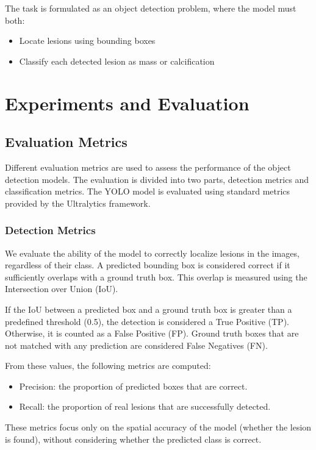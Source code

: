 \documentclass[12pt,a4paper]{article} %
\begin{document}
The task is formulated as an object detection problem, where the model must both:
\begin{itemize}
  \item Locate lesions using bounding boxes
  \item Classify each detected lesion as mass or calcification
\end{itemize}

\section{Experiments and Evaluation}
\subsection{Evaluation Metrics}

Different evaluation metrics are used to assess the performance of the object detection models. The evaluation is divided into two parts, detection metrics and classification metrics. The YOLO model is evaluated using standard metrics provided by the Ultralytics framework.

\subsubsection{Detection Metrics}

We evaluate the ability of the model to correctly localize lesions in the images, regardless of their class. A predicted bounding box is considered correct if it sufficiently overlaps with a ground truth box. This overlap is measured using the Intersection over Union (IoU).

If the IoU between a predicted box and a ground truth box is greater than a predefined threshold (0.5), the detection is considered a True Positive (TP). Otherwise, it is counted as a False Positive (FP). Ground truth boxes that are not matched with any prediction are considered False Negatives (FN).

From these values, the following metrics are computed:

\begin{itemize}
    \item Precision: the proportion of predicted boxes that are correct.
    \item Recall: the proportion of real lesions that are successfully detected.
\end{itemize}

These metrics focus only on the spatial accuracy of the model (whether the lesion is found), without considering whether the predicted class is correct.
\end{document}
